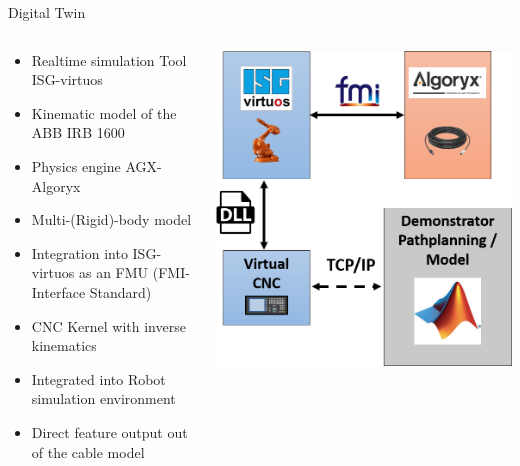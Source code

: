 \documentclass[
xcolor=dvipsnames,
aspectratio=169,
9pt,
]{beamer}
\begin{document}
\begin{frame}{Digital Twin}

\vspace*{-1cm}
\begin{columns}
	\begin{column}{.5\textwidth}
		\begin{itemize}
			\item Realtime simulation Tool ISG-virtuos
			\item Kinematic model of the ABB IRB 1600
 		\end{itemize}
        \begin{itemize}
			\item Physics engine AGX-Algoryx
            \item Multi-(Rigid)-body model
			\item Integration into ISG-virtuos as an FMU (FMI-Interface Standard)
 		\end{itemize}
        \begin{itemize}
			\item CNC Kernel with inverse kinematics
			\item Integrated into Robot simulation environment
 		\end{itemize}
        \begin{itemize}
			\item Direct feature output out of the cable model
 		\end{itemize}
        \end{column}
     \begin{column}{.5\textwidth}
     \includegraphics[width=.8\columnwidth]{Digital_Twin}
     \end{column}
       
\end{columns}
\end{frame}
\end{document}
